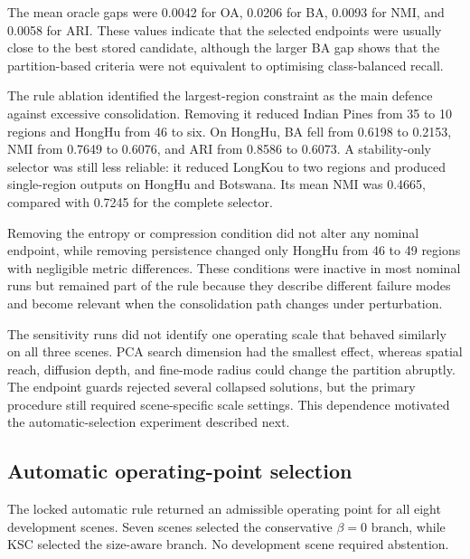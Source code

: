 \documentclass[10pt,a4paper,fleqn]{article}
\begin{document}
The mean oracle gaps were 0.0042 for OA, 0.0206 for BA, 0.0093 for NMI,
and 0.0058 for ARI. These values indicate that the selected endpoints were
usually close to the best stored candidate, although the larger BA gap shows
that the partition-based criteria were not equivalent to optimising class-balanced
recall.

The rule ablation identified the largest-region constraint as the main defence
against excessive consolidation. Removing it reduced Indian Pines from 35 to
10 regions and HongHu from 46 to six. On HongHu, BA fell from 0.6198 to
0.2153, NMI from 0.7649 to 0.6076, and ARI from 0.8586 to 0.6073.
A stability-only selector was still less reliable: it reduced LongKou to two
regions and produced single-region outputs on HongHu and Botswana. Its mean
NMI was 0.4665, compared with 0.7245 for the complete selector.

Removing the entropy or compression condition did not alter any nominal
endpoint, while removing persistence changed only HongHu from 46 to 49
regions with negligible metric differences. These conditions were inactive in
most nominal runs but remained part of the rule because they describe
different failure modes and become relevant when the consolidation path
changes under perturbation.

The sensitivity runs did not identify one operating scale that behaved
similarly on all three scenes. PCA search dimension had the smallest effect,
whereas spatial reach, diffusion depth, and fine-mode radius could change the
partition abruptly. The endpoint guards rejected several collapsed solutions,
but the primary procedure still required scene-specific scale settings. This
dependence motivated the automatic-selection experiment described next.
\subsection{Automatic operating-point selection}
\label{subsec:auto_selector_results}

The locked automatic rule returned an admissible operating point for all eight
development scenes. Seven scenes selected the conservative \(\beta=0\)
branch, while KSC selected the size-aware branch. No development scene
required abstention.
\end{document}
